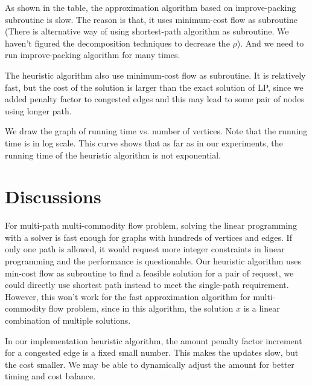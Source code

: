 \documentclass[a4paper]{article}
\begin{document}
As shown in the table, the approximation algorithm based on improve-packing subroutine is slow. The reason is that, it uses minimum-cost flow as subroutine (There is alternative way of using shortest-path algorithm as subroutine. We haven't figured the decomposition techniques to decrease the $\rho$). And we need to run improve-packing algorithm for many times.

The heuristic algorithm also use minimum-cost flow as subroutine. It is relatively fast, but the cost of the solution is larger than the exact solution of LP, since we added penalty factor to congested edges and this may lead to some pair of nodes using longer path.

We draw the graph of running time vs. number of vertices. Note that the running time is in log scale. This curve shows that as far as in our experiments, the running time of the heuristic algorithm is not exponential.

\begin{figure}[th]
\begin{center}
\end{center}
\end{figure}

\section*{Discussions}
For multi-path multi-commodity flow problem, solving the linear programming with a solver is fast enough for graphs with hundreds of vertices and edges. If only one path is allowed, it would request more integer constraints in linear programming and the performance is questionable. Our heuristic algorithm uses min-cost flow as subroutine to find a feasible solution for a pair of request, we could directly use shortest path instead to meet the single-path requirement. However, this won't work for the fast approximation algorithm for multi-commodity flow problem, since in this algorithm, the solution $x$ is a linear combination of multiple solutions. 

In our implementation heuristic algorithm, the amount penalty factor increment for a congested edge  is a fixed small number. This makes the updates slow, but the cost smaller. We may be able to dynamically adjust the amount for better timing and cost balance.



\end{document}
